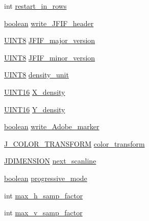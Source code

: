 \begin{DoxyCompactItemize}
\item 
int \hyperlink{structjpeg__compress__struct_a9636f9df88d5a3ae56f0bb9a5f923db7}{restart\+\_\+in\+\_\+rows}
\item 
\hyperlink{jmorecfg_8h_a7c6368b321bd9acd0149b030bb8275ed}{boolean} \hyperlink{structjpeg__compress__struct_a12178443b9177fd4bdddc66ce4e08e12}{write\+\_\+\+J\+F\+I\+F\+\_\+header}
\item 
\hyperlink{jmorecfg_8h_adfb9a8ea1dd59f151065f763e1e9acd6}{U\+I\+N\+T8} \hyperlink{structjpeg__compress__struct_a8e2468a5bffedad2257c715a59ded2e0}{J\+F\+I\+F\+\_\+major\+\_\+version}
\item 
\hyperlink{jmorecfg_8h_adfb9a8ea1dd59f151065f763e1e9acd6}{U\+I\+N\+T8} \hyperlink{structjpeg__compress__struct_a9653a22025ac9ff342d6f4221e2a9564}{J\+F\+I\+F\+\_\+minor\+\_\+version}
\item 
\hyperlink{jmorecfg_8h_adfb9a8ea1dd59f151065f763e1e9acd6}{U\+I\+N\+T8} \hyperlink{structjpeg__compress__struct_a8f3a056ed558bf7be4ff52999416a525}{density\+\_\+unit}
\item 
\hyperlink{jmorecfg_8h_a805c2c164bdd38d72a30c46e84fb568b}{U\+I\+N\+T16} \hyperlink{structjpeg__compress__struct_adef3c4b809ebca2a853b5659e177deaa}{X\+\_\+density}
\item 
\hyperlink{jmorecfg_8h_a805c2c164bdd38d72a30c46e84fb568b}{U\+I\+N\+T16} \hyperlink{structjpeg__compress__struct_a978dc1c187fab34211757a134ebf4adb}{Y\+\_\+density}
\item 
\hyperlink{jmorecfg_8h_a7c6368b321bd9acd0149b030bb8275ed}{boolean} \hyperlink{structjpeg__compress__struct_a39c549a441052b38df2dfd7359c68814}{write\+\_\+\+Adobe\+\_\+marker}
\item 
\hyperlink{jpeglib_8h_a26af503ae521188ce89abc2c7adee7f0}{J\+\_\+\+C\+O\+L\+O\+R\+\_\+\+T\+R\+A\+N\+S\+F\+O\+R\+M} \hyperlink{structjpeg__compress__struct_a3533c65068c4cec8f048019d2b1c0557}{color\+\_\+transform}
\item 
\hyperlink{jmorecfg_8h_a04ed4674f6f1d0d50ec241531e38274f}{J\+D\+I\+M\+E\+N\+S\+I\+O\+N} \hyperlink{structjpeg__compress__struct_aefb3f2e6479374ba03e7d0421dcfb086}{next\+\_\+scanline}
\item 
\hyperlink{jmorecfg_8h_a7c6368b321bd9acd0149b030bb8275ed}{boolean} \hyperlink{structjpeg__compress__struct_ae3b16d173e7feef7b6b0e823fd2fde3f}{progressive\+\_\+mode}
\item 
int \hyperlink{structjpeg__compress__struct_ae8de4e6079b80e3a81135d07934c640d}{max\+\_\+h\+\_\+samp\+\_\+factor}
\item 
int \hyperlink{structjpeg__compress__struct_a9e03a4eb7af87c682937caed3d341d4a}{max\+\_\+v\+\_\+samp\+\_\+factor}

\end{DoxyCompactItemize}
